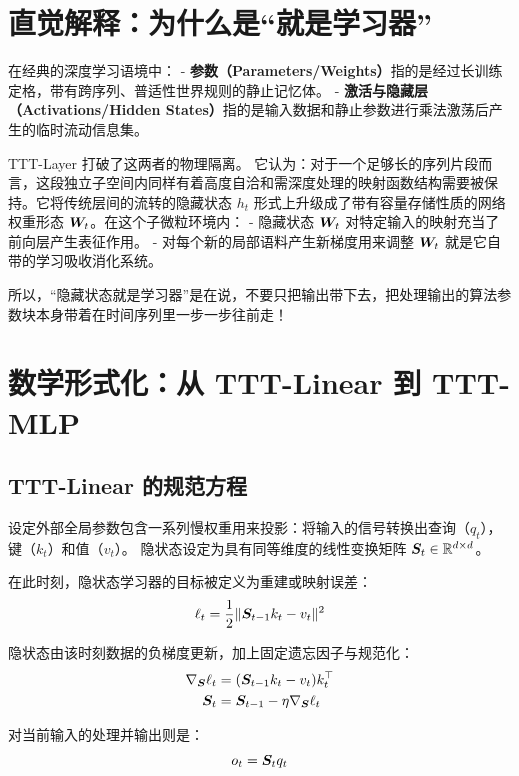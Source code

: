 \section{直觉解释：为什么是“就是学习器”}
\label{sec:ttt_layers_intuition}

在经典的深度学习语境中：
- \textbf{参数（Parameters/Weights）}指的是经过长训练定格，带有跨序列、普适性世界规则的静止记忆体。
- \textbf{激活与隐藏层（Activations/Hidden States）}指的是输入数据和静止参数进行乘法激荡后产生的临时流动信息集。

TTT-Layer 打破了这两者的物理隔离。
它认为：对于一个足够长的序列片段而言，这段独立子空间内同样有着高度自洽和需深度处理的映射函数结构需要被保持。它将传统层间的流转的隐藏状态 $h_t$ 形式上升级成了带有容量存储性质的网络权重形态 $\boldsymbol{W}_t$。在这个子微粒环境内：
- 隐藏状态 $\boldsymbol{W}_{t}$ 对特定输入的映射充当了前向层产生表征作用。
- 对每个新的局部语料产生新梯度用来调整 $\boldsymbol{W}_{t}$ 就是它自带的学习吸收消化系统。

所以，“隐藏状态就是学习器”是在说，不要只把输出带下去，把处理输出的算法参数块本身带着在时间序列里一步一步往前走！

\section{数学形式化：从 TTT-Linear 到 TTT-MLP}
\label{sec:ttt_layers_math}

\subsection{TTT-Linear 的规范方程}
设定外部全局参数包含一系列慢权重用来投影：将输入的信号转换出查询（$q_t$），键（$k_t$）和值（$v_t$）。
隐状态设定为具有同等维度的线性变换矩阵 $\boldsymbol{S}_{t} \in \mathbb{R}^{d \times d}$。

在此时刻，隐状态学习器的目标被定义为重建或映射误差：
\begin{equation}
   \ell_{t} = \frac{1}{2} \| \boldsymbol{S}_{t-1} k_t - v_t \|^2
\end{equation}

隐状态由该时刻数据的负梯度更新，加上固定遗忘因子与规范化：
\begin{align}
   \nabla_{\boldsymbol{S}} \ell_t &= (\boldsymbol{S}_{t-1} k_t - v_t) k_t^\top \label{eq:ttt_linear_grad} \\
   \boldsymbol{S}_{t} &= \boldsymbol{S}_{t-1} - \eta \nabla_{\boldsymbol{S}} \ell_t
\end{align}

对当前输入的处理并输出则是：
\begin{equation}
   o_t = \boldsymbol{S}_{t} q_t
\end{equation}

